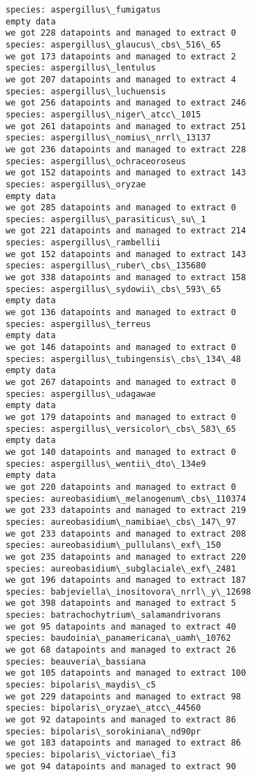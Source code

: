 \documentclass[11pt]{article}
\begin{document}
\begin{Verbatim}[commandchars=\\\{\}]
species: aspergillus\_fumigatus
empty data
we got 228 datapoints and managed to extract 0
species: aspergillus\_glaucus\_cbs\_516\_65
we got 173 datapoints and managed to extract 2
species: aspergillus\_lentulus
we got 207 datapoints and managed to extract 4
species: aspergillus\_luchuensis
we got 256 datapoints and managed to extract 246
species: aspergillus\_niger\_atcc\_1015
we got 261 datapoints and managed to extract 251
species: aspergillus\_nomius\_nrrl\_13137
we got 236 datapoints and managed to extract 228
species: aspergillus\_ochraceoroseus
we got 152 datapoints and managed to extract 143
species: aspergillus\_oryzae
empty data
we got 285 datapoints and managed to extract 0
species: aspergillus\_parasiticus\_su\_1
we got 221 datapoints and managed to extract 214
species: aspergillus\_rambellii
we got 152 datapoints and managed to extract 143
species: aspergillus\_ruber\_cbs\_135680
we got 338 datapoints and managed to extract 158
species: aspergillus\_sydowii\_cbs\_593\_65
empty data
we got 136 datapoints and managed to extract 0
species: aspergillus\_terreus
empty data
we got 146 datapoints and managed to extract 0
species: aspergillus\_tubingensis\_cbs\_134\_48
empty data
we got 267 datapoints and managed to extract 0
species: aspergillus\_udagawae
empty data
we got 179 datapoints and managed to extract 0
species: aspergillus\_versicolor\_cbs\_583\_65
empty data
we got 140 datapoints and managed to extract 0
species: aspergillus\_wentii\_dto\_134e9
empty data
we got 220 datapoints and managed to extract 0
species: aureobasidium\_melanogenum\_cbs\_110374
we got 233 datapoints and managed to extract 219
species: aureobasidium\_namibiae\_cbs\_147\_97
we got 233 datapoints and managed to extract 208
species: aureobasidium\_pullulans\_exf\_150
we got 235 datapoints and managed to extract 220
species: aureobasidium\_subglaciale\_exf\_2481
we got 196 datapoints and managed to extract 187
species: babjeviella\_inositovora\_nrrl\_y\_12698
we got 398 datapoints and managed to extract 5
species: batrachochytrium\_salamandrivorans
we got 95 datapoints and managed to extract 40
species: baudoinia\_panamericana\_uamh\_10762
we got 68 datapoints and managed to extract 26
species: beauveria\_bassiana
we got 105 datapoints and managed to extract 100
species: bipolaris\_maydis\_c5
we got 229 datapoints and managed to extract 98
species: bipolaris\_oryzae\_atcc\_44560
we got 92 datapoints and managed to extract 86
species: bipolaris\_sorokiniana\_nd90pr
we got 183 datapoints and managed to extract 86
species: bipolaris\_victoriae\_fi3
we got 94 datapoints and managed to extract 90

\end{Verbatim}
\end{document}
